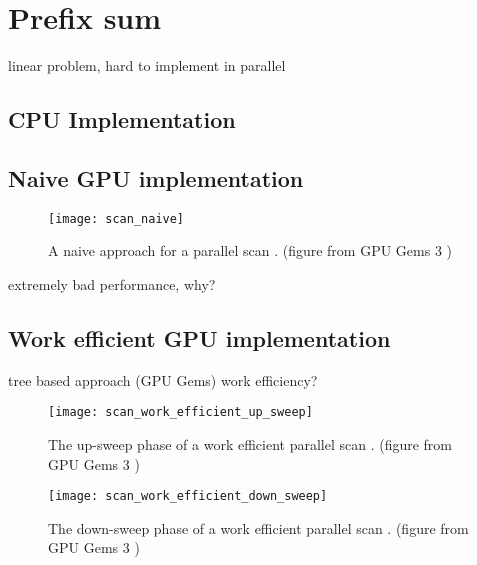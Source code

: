 \section{Prefix sum}
\label{sec:prefix_sum}

linear problem, hard to implement in parallel

\subsection{CPU Implementation}




\subsection{Naive GPU implementation}

\begin{figure}
\centering
\texttt{[image: scan\_naive]}
\caption{A naive approach for a parallel scan \cite{scan_naive}. (figure from GPU Gems 3 \cite{gpu_gems_3_chapter_39})}
\label{fig:scan_naive}
\end{figure}





extremely bad performance, why?

\subsection{Work efficient GPU implementation}

tree based approach (GPU Gems) work efficiency?

\begin{figure}
\centering
\texttt{[image: scan\_work\_efficient\_up\_sweep]}
\caption{The up-sweep phase of a work efficient parallel scan \cite{scan_blelloch}.  (figure from GPU Gems 3 \cite{gpu_gems_3_chapter_39})}
\label{fig:scan_work_efficient_up_sweep}
\end{figure}

\begin{figure}
\centering
\texttt{[image: scan\_work\_efficient\_down\_sweep]}
\caption{The down-sweep phase of a work efficient parallel scan \cite{scan_blelloch}.  (figure from GPU Gems 3 \cite{gpu_gems_3_chapter_39})}
\label{fig:scan_work_efficient_down_sweep}
\end{figure}

